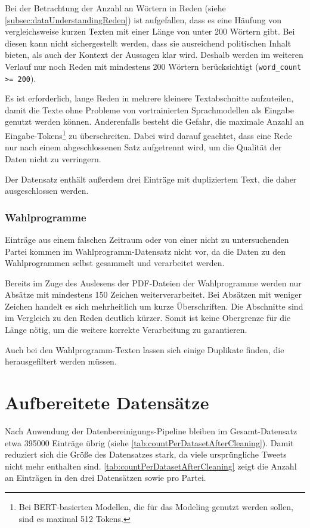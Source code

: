 Bei der Betrachtung der Anzahl an Wörtern in Reden (siehe \autoref{subsec:dataUnderstandingReden}) ist aufgefallen, dass es eine Häufung von vergleichsweise kurzen Texten mit einer Länge von unter \num{200} Wörtern gibt. Bei diesen kann nicht sichergestellt werden, dass sie ausreichend politischen Inhalt bieten, als auch der Kontext der Aussagen klar wird. Deshalb werden im weiteren Verlauf nur noch Reden mit mindestens 200 Wörtern berücksichtigt (\texttt{word\_count >= 200}).

Es ist erforderlich, lange Reden in mehrere kleinere Textabschnitte aufzuteilen, damit die Texte ohne Probleme von vortrainierten Sprachmodellen als Eingabe genutzt werden können. Anderenfalls besteht die Gefahr, die maximale Anzahl an Eingabe-Tokens\footnote{Bei \ac{BERT}-basierten Modellen, die für das Modeling genutzt werden sollen, sind es maximal \num{512} Tokens.} zu überschreiten. Dabei wird darauf geachtet, dass eine Rede nur nach einem abgeschlossenen Satz aufgetrennt wird, um die Qualität der Daten nicht zu verringern.

Der Datensatz enthält außerdem drei Einträge mit dupliziertem Text, die daher ausgeschlossen werden.

\subsubsection*{Wahlprogramme}

Einträge aus einem falschen Zeitraum oder von einer nicht zu untersuchenden Partei kommen im Wahlprogramm-Datensatz nicht vor, da die Daten zu den Wahlprogrammen selbst gesammelt und verarbeitet werden.

Bereits im Zuge des Auslesens der \ac{PDF}-Dateien der Wahlprogramme werden nur Absätze mit mindestens \num{150} Zeichen weiterverarbeitet. Bei Absätzen mit weniger Zeichen handelt es sich mehrheitlich um kurze Überschriften. Die Abschnitte sind im Vergleich zu den Reden deutlich kürzer. Somit ist keine Obergrenze für die Länge nötig, um die weitere korrekte Verarbeitung zu garantieren.

Auch bei den Wahlprogramm-Texten lassen sich einige Duplikate finden, die herausgefiltert werden müssen.


\section{Aufbereitete Datensätze} \label{sec:processedDataframes}

Nach Anwendung der Datenbereinigungs-Pipeline bleiben im Gesamt-Datensatz etwa \num{395000} Einträge übrig (siehe \autoref{tab:countPerDatasetAfterCleaning}). Damit reduziert sich die Größe des Datensatzes stark, da viele ursprüngliche Tweets nicht mehr enthalten sind. \autoref{tab:countPerDatasetAfterCleaning} zeigt die Anzahl an Einträgen in den drei Datensätzen sowie pro Partei.

